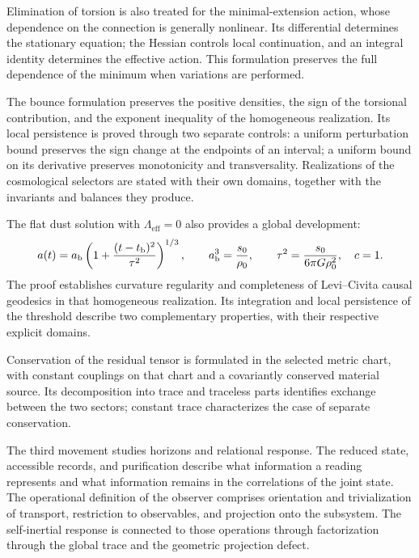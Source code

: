 Elimination of torsion is also treated for the minimal-extension
action, whose dependence on the connection is generally
nonlinear. Its differential determines the stationary equation;
the Hessian controls local continuation, and an integral identity
determines the effective action. This formulation preserves the
full dependence of the minimum when variations are performed.

The bounce formulation preserves the positive densities, the sign of
the torsional contribution, and the exponent inequality of the homogeneous
realization. Its local persistence is proved through two separate
controls: a uniform perturbation bound preserves the sign change
at the endpoints of an interval; a uniform bound on its derivative
preserves monotonicity and transversality. Realizations of the cosmological
selectors are stated with their own domains, together with the
invariants and balances they produce.

The flat dust solution with \(\Lambda_{\mathrm{eff}}=0\)
also provides a global development:
\[
 a(t)=a_{\rm b}\left(1+
       \frac{(t-t_{\rm b})^2}{\tau^2}\right)^{1/3},
 \qquad
 a_{\rm b}^3=\frac{s_0}{\rho_0},\qquad
 \tau^2=\frac{s_0}{6\pi G\rho_0^2},
 \quad c=1.
\]
The proof establishes curvature regularity and completeness of
Levi--Civita causal geodesics in that homogeneous realization.
Its integration and local persistence of the threshold describe two
complementary properties, with their respective explicit domains.

Conservation of the residual tensor is formulated in the selected
metric chart, with constant couplings on that chart and a
covariantly conserved material source. Its decomposition into trace
and traceless parts identifies exchange between the two sectors;
constant trace characterizes the case of separate conservation.

The third movement studies horizons and relational response. The reduced
state, accessible records, and purification describe
what information a reading represents and what information remains in
the correlations of the joint state. The operational definition of the
observer comprises orientation and trivialization of transport,
restriction to observables, and projection onto the subsystem. The
self-inertial response is connected to those operations through factorization
through the global trace and the geometric projection defect.

